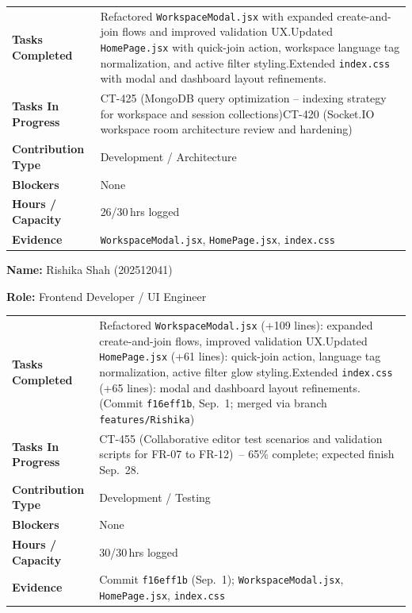 \documentclass[11pt,a4paper]{article}
\newcommand{\field}[2]{\textbf{#1:} #2\par}
\begin{document}
\vspace{4pt}

{\small
\begin{tabular}{>{\bfseries}p{} p{}}
\toprule
Tasks Completed & Refactored \texttt{WorkspaceModal.jsx} with expanded create-and-join flows and improved validation UX.\newline Updated \texttt{HomePage.jsx} with quick-join action, workspace language tag normalization, and active filter styling.\newline Extended \texttt{index.css} with modal and dashboard layout refinements. \\
Tasks In Progress & CT-425 (MongoDB query optimization -- indexing strategy for workspace and session collections)\newline CT-420 (Socket.IO workspace room architecture review and hardening) \\
Contribution Type & Development / Architecture \\
Blockers & None \\
Hours / Capacity & 26/30\,hrs logged \\
Evidence & \texttt{WorkspaceModal.jsx}, \texttt{HomePage.jsx}, \texttt{index.css} \\
\bottomrule
\end{tabular}
}

\vspace{6pt}

\field{Name}{Rishika Shah (202512041)}
\field{Role}{Frontend Developer / UI Engineer}

\vspace{4pt}

{\small
\begin{tabular}{>{\bfseries}p{} p{}}
\toprule
Tasks Completed & Refactored \texttt{WorkspaceModal.jsx} (+109 lines): expanded create-and-join flows, improved validation UX.\newline Updated \texttt{HomePage.jsx} (+61 lines): quick-join action, language tag normalization, active filter glow styling.\newline Extended \texttt{index.css} (+65 lines): modal and dashboard layout refinements.\newline (Commit \texttt{f16eff1b}, Sep.\ 1; merged via branch \texttt{features/Rishika}) \\
Tasks In Progress & CT-455 (Collaborative editor test scenarios and validation scripts for FR-07 to FR-12)~-- 65\% complete; expected finish Sep.\ 28. \\
Contribution Type & Development / Testing \\
Blockers & None \\
Hours / Capacity & 30/30\,hrs logged \\
Evidence & Commit \texttt{f16eff1b} (Sep.\ 1); \texttt{WorkspaceModal.jsx}, \texttt{HomePage.jsx}, \texttt{index.css} \\
\bottomrule
\end{tabular}
}
\end{document}
